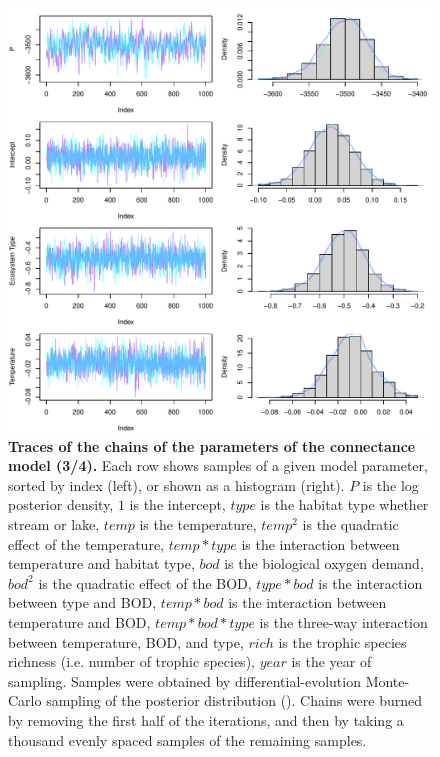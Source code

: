 \documentclass[11pt, oneside]{article}
\begin{document}
\begin{figure}[H]
\begin{center}
\includegraphics[page=3, width=1\linewidth]{scripts/b0_6_4/out_con/fig_tracePlot_beta.pdf}
\caption{
    \textbf{Traces of the chains of the parameters of the connectance model (3/4).}
    Each row shows samples of a given model parameter, sorted by index (left), or shown as a histogram (right).
    $P$ is the log posterior density, $1$ is the intercept, $type$ is the habitat type whether stream or lake, $temp$ is the temperature, $temp^2$ is the quadratic effect of the temperature, $temp * type$ is the interaction between temperature and habitat type, $bod$ is the biological oxygen demand, $bod^2$ is the quadratic effect of the BOD, $type * bod$ is the interaction between type and BOD, $temp * bod$ is the interaction between temperature and BOD, $temp * bod * type$ is the three-way interaction between temperature, BOD, and type, $rich$ is the trophic species richness (i.e. number of trophic species), $year$ is the year of sampling.
    Samples were obtained by differential-evolution Monte-Carlo sampling of the posterior distribution (\cite{TerBraak2006}).
    Chains were burned by removing the first half of the iterations, and then by taking a thousand evenly spaced samples of the remaining samples.
}
\end{center}
\end{figure}
\end{document}
